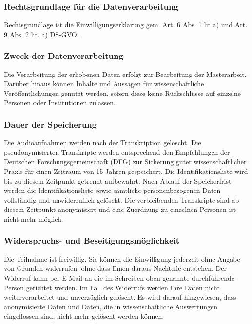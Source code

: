 \documentclass[11pt,a4paper]{article}
\begin{document}
\subsubsection{Rechtsgrundlage für die Datenverarbeitung}

Rechtsgrundlage ist die Einwilligungserklärung gem. Art. 6 Abs. 1 lit a) und Art. 9 Abs. 2 lit. a) DS-GVO.

\subsubsection{ Zweck der Datenverarbeitung}

Die Verarbeitung der erhobenen Daten erfolgt zur Bearbeitung der Masterarbeit.
Darüber hinaus können Inhalte und Aussagen für wissenschaftliche Veröffentlichungen genutzt werden, sofern diese keine Rückschlüsse auf einzelne Personen oder Institutionen zulassen.


\subsubsection{Dauer der Speicherung}

Die Audioaufnahmen werden nach der Transkription gelöscht.
Die pseudonymisierten Transkripte werden entsprechend den Empfehlungen der Deutschen Forschungsgemeinschaft (DFG) zur Sicherung guter wissenschaftlicher Praxis für einen Zeitraum von 15 Jahren gespeichert.
 Die Identifikationsliste wird bis zu diesem Zeitpunkt getrennt aufbewahrt.
Nach Ablauf der Speicherfrist werden die Identifikationsliste sowie sämtliche personenbezogenen Daten vollständig und unwiderruflich gelöscht.
Die verbleibenden Transkripte sind ab diesem Zeitpunkt anonymisiert und eine Zuordnung zu einzelnen Personen ist nicht mehr möglich.

\subsubsection{Widerspruchs- und Beseitigungsmöglichkeit}

Die Teilnahme ist freiwillig.
Sie können die Einwilligung jederzeit ohne Angabe von Gründen widerrufen, ohne dass Ihnen daraus Nachteile entstehen.
Der Widerruf kann per E-Mail an die im Schreiben oben genannte durchführende Person gerichtet werden.
Im Fall des Widerrufs werden Ihre Daten nicht weiterverarbeitet und unverzüglich gelöscht.
Es wird darauf hingewiesen, dass anonymisierte Daten und Daten, die in wissenschaftliche Auswertungen eingeflossen sind, nicht mehr gelöscht werden können.
\end{document}
